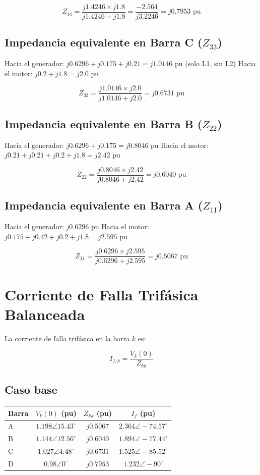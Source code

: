 \documentclass[12pt,a4paper]{article}
\begin{document}
\[
Z_{44} = \frac{j1.4246 \times j1.8}{j1.4246 + j1.8} = \frac{-2.564}{j3.2246} = j0.7953\text{ pu}
\]

\subsection{Impedancia equivalente en Barra C ($Z_{33}$)}

Hacia el generador: $j0.6296 + j0.175 + j0.21 = j1.0146$ pu (solo L1, sin L2)
Hacia el motor: $j0.2 + j1.8 = j2.0$ pu

\[
Z_{33} = \frac{j1.0146 \times j2.0}{j1.0146 + j2.0} = j0.6731\text{ pu}
\]

\subsection{Impedancia equivalente en Barra B ($Z_{22}$)}

Hacia el generador: $j0.6296 + j0.175 = j0.8046$ pu
Hacia el motor: $j0.21 + j0.21 + j0.2 + j1.8 = j2.42$ pu

\[
Z_{22} = \frac{j0.8046 \times j2.42}{j0.8046 + j2.42} = j0.6040\text{ pu}
\]

\subsection{Impedancia equivalente en Barra A ($Z_{11}$)}

Hacia el generador: $j0.6296$ pu
Hacia el motor: $j0.175 + j0.42 + j0.2 + j1.8 = j2.595$ pu

\[
Z_{11} = \frac{j0.6296 \times j2.595}{j0.6296 + j2.595} = j0.5067\text{ pu}
\]

\section{Corriente de Falla Trifásica Balanceada}

La corriente de falla trifásica en la barra $k$ es:

\[
I_{f,k} = \frac{V_k(0)}{Z_{kk}}
\]

\subsection{Caso base}

\begin{center}
\begin{tabular}{lccc}
\toprule
Barra & $V_k(0)$ (pu) & $Z_{kk}$ (pu) & $I_f$ (pu) \\
\midrule
A & $1.198\angle15.43^\circ$ & $j0.5067$ & $2.364\angle-74.57^\circ$ \\
B & $1.144\angle12.56^\circ$ & $j0.6040$ & $1.894\angle-77.44^\circ$ \\
C & $1.027\angle4.48^\circ$ & $j0.6731$ & $1.525\angle-85.52^\circ$ \\
D & $0.98\angle0^\circ$ & $j0.7953$ & $1.232\angle-90^\circ$ \\
\bottomrule
\end{tabular}
\end{center}
\end{document}
